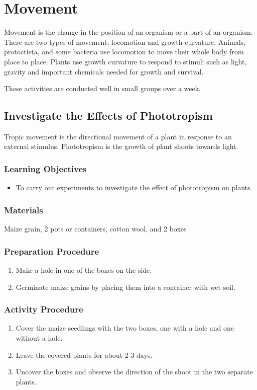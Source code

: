 \section{Movement}
Movement is the change in the position of an organism or a part of an organism. There are two types of movement: locomotion and growth curvature. Animals, protoctista, and some bacteria use locomotion to move their whole body from place to place. Plants use growth curvature to respond to stimuli such as light, gravity and important chemicals needed for growth and survival.

These activities are conducted well in small groups over a week. 

\subsection{Investigate the Effects of Phototropism}
Tropic movement is the directional movement of a plant in response to an external stimulus. Phototropism is the growth of plant shoots towards light.

\subsubsection*{Learning Objectives}
\begin{itemize}
\item{To carry out experiments to investigate the effect of phototropism on plants.}
\end{itemize}

\subsubsection*{Materials}
Maize grain, 2 pots or containers, cotton wool, and 2 boxes

\subsubsection*{Preparation Procedure}
\begin{enumerate}
\item{Make a hole in one of the boxes on the side.}
\item{Germinate maize grains by placing them into a container with wet soil.}
\end{enumerate}

\subsubsection*{Activity Procedure}
\begin{enumerate}
\item{Cover the maize seedlings with the two boxes, one with a hole and one without a hole.}
\item{Leave the covered plants for about 2-3 days.}
\item{Uncover the boxes and observe the direction of the shoot in the two separate plants.}
\end{enumerate}

